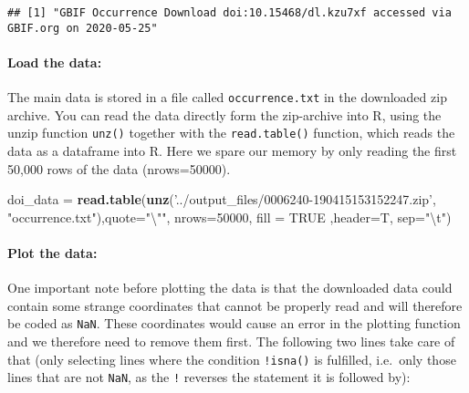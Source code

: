 \documentclass[]{article}
\newenvironment{Shaded}{\begin{snugshade}}{\end{snugshade}}
\newcommand{\CharTok}[1]{\textcolor[rgb]{0.31,0.60,0.02}{#1}}
\newcommand{\CommentTok}[1]{\textcolor[rgb]{0.56,0.35,0.01}{\textit{#1}}}
\newcommand{\DataTypeTok}[1]{\textcolor[rgb]{0.13,0.29,0.53}{#1}}
\newcommand{\DecValTok}[1]{\textcolor[rgb]{0.00,0.00,0.81}{#1}}
\newcommand{\KeywordTok}[1]{\textcolor[rgb]{0.13,0.29,0.53}{\textbf{#1}}}
\newcommand{\NormalTok}[1]{#1}
\newcommand{\OperatorTok}[1]{\textcolor[rgb]{0.81,0.36,0.00}{\textbf{#1}}}
\newcommand{\OtherTok}[1]{\textcolor[rgb]{0.56,0.35,0.01}{#1}}
\newcommand{\StringTok}[1]{\textcolor[rgb]{0.31,0.60,0.02}{#1}}
\let\oldparagraph\paragraph
\renewcommand{\paragraph}[1]{\oldparagraph{#1}\mbox{}}
\begin{document}
\begin{verbatim}
## [1] "GBIF Occurrence Download doi:10.15468/dl.kzu7xf accessed via GBIF.org on 2020-05-25"
\end{verbatim}

\hypertarget{load-the-data}{%
\paragraph{Load the data:}\label{load-the-data}}

The main data is stored in a file called \texttt{occurrence.txt} in the
downloaded zip archive. You can read the data directly form the
zip-archive into R, using the unzip function \texttt{unz()} together
with the \texttt{read.table()} function, which reads the data as a
dataframe into R. Here we spare our memory by only reading the first
50,000 rows of the data (nrows=50000).

\begin{Shaded}
\begin{Highlighting}[]
\NormalTok{doi_data =}\StringTok{ }\KeywordTok{read.table}\NormalTok{(}\KeywordTok{unz}\NormalTok{(}\StringTok{'../output_files/0006240-190415153152247.zip'}\NormalTok{, }\StringTok{"occurrence.txt"}\NormalTok{),}\DataTypeTok{quote=}\StringTok{"}\CharTok{\textbackslash{}"}\StringTok{"}\NormalTok{, }\DataTypeTok{nrows=}\DecValTok{50000}\NormalTok{, }\DataTypeTok{fill =} \OtherTok{TRUE}\NormalTok{ ,}\DataTypeTok{header=}\NormalTok{T, }\DataTypeTok{sep=}\StringTok{"}\CharTok{\textbackslash{}t}\StringTok{"}\NormalTok{)}
\end{Highlighting}
\end{Shaded}

\hypertarget{plot-the-data}{%
\paragraph{Plot the data:}\label{plot-the-data}}

One important note before plotting the data is that the downloaded data
could contain some strange coordinates that cannot be properly read and
will therefore be coded as \texttt{NaN}. These coordinates would cause
an error in the plotting function and we therefore need to remove them
first. The following two lines take care of that (only selecting lines
where the condition \texttt{!isna()} is fulfilled, i.e.~only those lines
that are not \texttt{NaN}, as the \texttt{!} reverses the statement it
is followed by):

\begin{Shaded}
\end{Shaded}
\end{document}
